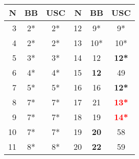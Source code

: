 \begin{table}[t]\scriptsize
\begin{tabular}{r|cc||r|cc}
 \hline
 N&BB &USC&N&BB&USC\\
 \hline
 3&2*&2*&12&9*&9*\\
 4&2*&2*&13&10*&10*\\
 5&3*&3*&14&12&\textbf{12*}\\
 6&4*&4*&15&\textbf{12}&49\\
 7&5*&5*&16&16&\textbf{12*}\\
 8&7*&7*&17&21&\textbf{\textcolor{red}{13*}}\\
 9&7*&7*&18&19&\textbf{\textcolor{red}{14*}}\\
 10&7*&7*&19&\textbf{20}&58\\
 11&8*&8*&20&\textbf{22}&59\\
\end{tabular}
\end{table} 
